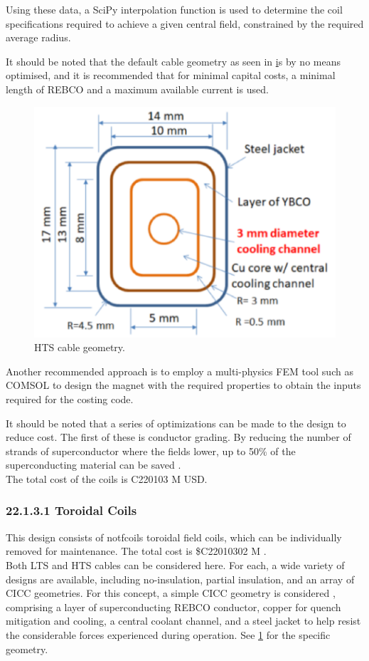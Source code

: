 Using these data, a SciPy interpolation function is used to determine the coil specifications required to achieve a given central field, constrained by the required average radius.

It should be noted that the default cable geometry as seen in \href{fig:yuhu_cs} is by no means optimised, and it is recommended that for minimal capital costs, a minimal length of REBCO and a maximum available current is used.


\begin{figure}[h]
    \centering
    \includegraphics[width =0.5\linewidth]{StandardFigures/yuhu_cs.pdf}
    \caption{HTS cable geometry.}
    \label{fig:yuhu_cs}
\end{figure}

Another recommended approach is to employ a multi-physics FEM tool such as COMSOL to design the magnet with the required properties to obtain the inputs required for the costing code.

It should be noted that a series of optimizations can be made to the design to reduce cost. The first of these is conductor grading. By reducing the number of strands of superconductor where the fields lower, up to 50\% of the superconducting material can be saved \cite{uglietti2018progressing}.\\

The total cost of the coils is C220103 M USD.


\subsubsection*{22.1.3.1 Toroidal Coils}

This design consists of notfcoils toroidal field coils, which can be individually removed for maintenance. The total cost is \$C22010302 M .\\

Both LTS and HTS cables can be considered here. For each, a wide variety of designs are available, including no-insulation, partial insulation, and an array of CICC geometries. For this concept, a simple CICC geometry is considered \cite{Menard2016}, comprising a layer of superconducting REBCO conductor, copper for quench mitigation and cooling, a central coolant channel, and a steel jacket to help resist the considerable forces experienced during operation. See \ref{fig:yuhu_cs} for the specific geometry.\\

